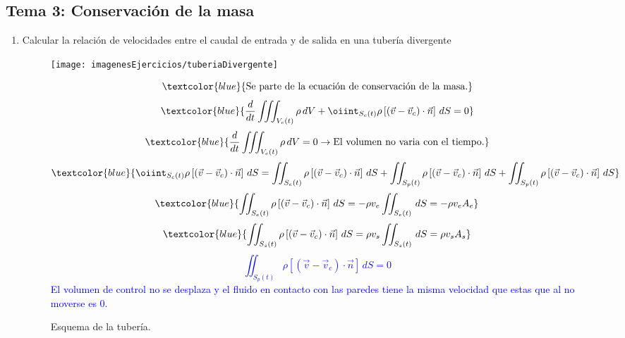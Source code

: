 \subsection{Tema 3: Conservación de la masa}
\begin{enumerate}
	\item  Calcular la relación de velocidades entre el caudal de entrada y de salida en una tubería divergente
	\begin{figure}[H]

		\centering
		\texttt{[image: imagenesEjercicios/tuberiaDivergente]}
		\caption{Esquema de la tubería.}
		\label{fig:tuberiadivergente}

	\[\textcolor{blue}{\text{Se parte de la ecuación de conservación de la masa.}}\]
	\[\textcolor{blue}{\frac{d}{dt}\iiint_{V_c(t)}\rho\,dV+\oiint_{S_c(t)} \rho\left[(\vec{v}-\vec{v}_c)\cdot\vec{n}\right] \,dS=0}\]
\[\textcolor{blue}{
	\frac{d}{dt}\iiint_{V_c(t)}\rho\,dV=0 \rightarrow \text{El volumen no varia con el tiempo.}
}\]
\[\textcolor{blue}{
	\oiint_{S_c(t)} \rho\left[(\vec{v}-\vec{v}_c)\cdot\vec{n}\right] \,dS=
	\iint_{S_e(t)} \rho\left[(\vec{v}-\vec{v}_c)\cdot\vec{n}\right] \,dS+
	\iint_{S_p(t)} \rho\left[(\vec{v}-\vec{v}_c)\cdot\vec{n}\right] \,dS+
	\iint_{S_p(t)} \rho\left[(\vec{v}-\vec{v}_c)\cdot\vec{n}\right] \,dS
}\]
\[\textcolor{blue}{
	\iint_{S_e(t)} \rho\left[(\vec{v}-\vec{v}_c)\cdot\vec{n}\right] \,dS=-\rho v_e \iint_{S_e(t)}  \,dS=-\rho v_e A_e
}\]
\[\textcolor{blue}{
	\iint_{S_s(t)} \rho\left[(\vec{v}-\vec{v}_c)\cdot\vec{n}\right] \,dS=\rho v_s \iint_{S_s(t)}  \,dS=\rho v_s A_s
}\]
\textcolor{blue}{
	\[\iint_{S_p(t)} \rho\left[(\vec{v}-\vec{v}_c)\cdot\vec{n}\right] \,dS=0 \]
	 El volumen de control no se desplaza y el fluido  en contacto con las paredes tiene la misma velocidad que estas que al no moverse es 0.}


\end{figure}
\end{enumerate}
